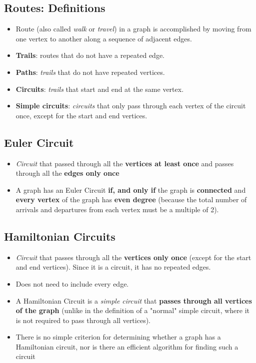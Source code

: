 \subsection{Routes: Definitions}
\begin{itemize}
  \item Route (also called \textit{walk} or \textit{travel}) in a graph is accomplished by moving from one vertex to another along a sequence of adjacent edges.
  \item \textbf{Trails}: routes that do not have a repeated edge.
  \item \textbf{Paths}: \textit{trails} that do not have repeated vertices.
  \item \textbf{Circuits}: \textit{trails} that start and end at the same vertex.
  \item \textbf{Simple circuits}: \textit{circuits} that only pass through each vertex of the circuit once, except for the start and end vertices.
\end{itemize}

\subsection{Euler Circuit}
\begin{itemize}
  \item \textit{Circuit} that passed through all the \textbf{vertices at least once} and passes through all the \textbf{edges only once}
  \item A graph has an Euler Circuit \textbf{if, and only if} the graph is \textbf{connected} and \textbf{every vertex} of the graph has \textbf{even degree} (because the total number of arrivals and departures from each vertex must be a multiple of 2).
\end{itemize}

\subsection{Hamiltonian Circuits}
\begin{itemize}
  \item \textit{Circuit} that passes through all the \textbf{vertices only once} (except for the start and end vertices). Since it is a circuit, it has no repeated edges.
  \item Does not need to include every edge.
  \item A Hamiltonian Circuit is a \textit{simple circuit} that \textbf{passes through all vertices of the graph} (unlike in the definition of a "normal" simple circuit, where it is not required to pass through all vertices).
  \item There is no simple criterion for determining whether a graph has a Hamiltonian circuit, nor is there an efficient algorithm for finding such a circuit
\end{itemize}

